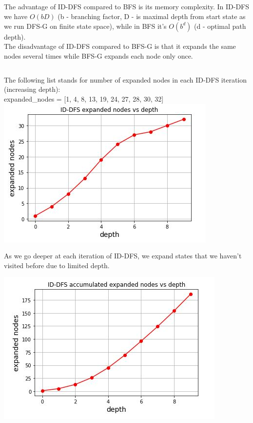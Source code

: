 \documentclass[12pt]{article}
\begin{document}
\subsection{}
The advantage of ID-DFS compared to BFS is its memory complexity. In ID-DFS we have $O(bD)$ (b - branching factor, D - is maximal depth from start state as we run DFS-G on finite state space), while in BFS it's $O(b^d)$ (d - optimal path depth).\\
The disadvantage of ID-DFS compared to BFS-G is that it expands the same nodes several times while BFS-G expands each node only once.

\subsection{}
The following list stands for number of expanded nodes in each ID-DFS iteration (increasing depth):\\
expanded\_nodes = [1, 4, 8, 13, 19, 24, 27, 28, 30, 32]\\

\includegraphics[scale=1]{id_dfs_plot2.JPG}

As we go deeper at each iteration of ID-DFS, we expand states that we haven't visited before due to limited depth.

\includegraphics[scale=1]{id_dfs_plot.JPG}
\end{document}

